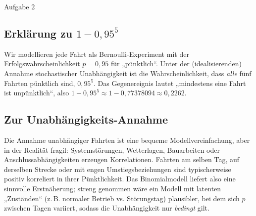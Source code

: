 \documentclass[11pt,a4paper,oneside]{article}
\begin{document}
	\begin{loesung}{Aufgabe 2}
		\subsection*{Erklärung zu $1-0{,}95^5$}
		Wir modellieren jede Fahrt als Bernoulli-Experiment mit der Erfolgswahrscheinlichkeit $p=0{,}95$ für „pünktlich“. Unter der (idealisierenden) Annahme stochastischer Unabhängigkeit ist die Wahrscheinlichkeit, dass \emph{alle} fünf Fahrten pünktlich sind, $0{,}95^5$. Das Gegenereignis lautet „mindestens eine Fahrt ist unpünktlich“, also $1-0{,}95^5\approx 1-0{,}77378094\approx 0{,}2262$.
		
		\subsection*{Zur Unabhängigkeits-Annahme}
		Die Annahme unabhängiger Fahrten ist eine bequeme Modellvereinfachung, aber in der Realität fragil: Systemstörungen, Wetterlagen, Bauarbeiten oder Anschlussabhängigkeiten erzeugen Korrelationen. Fahrten am selben Tag, auf derselben Strecke oder mit engen Umstiegsbeziehungen sind typischerweise positiv korreliert in ihrer Pünktlichkeit. Das Binomialmodell liefert also eine sinnvolle Erstnäherung; streng genommen wäre ein Modell mit latenten „Zuständen“ (z.\,B. normaler Betrieb vs. Störungstag) plausibler, bei dem sich $p$ zwischen Tagen variiert, sodass die Unabhängigkeit nur \emph{bedingt} gilt.
	\end{loesung}
	
\end{document}
